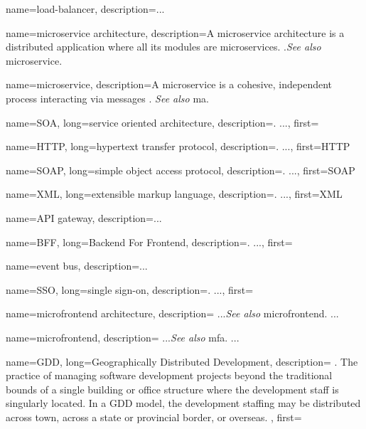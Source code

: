 {
    name=load-balancer,
    description={...} %
}

{
    name={microservice architecture},
    description={A microservice architecture is a distributed application where
    all its modules are microservices. \autocite{Dragoni_etal_2017}.\textit{See
    also} \gls{microservice}.} %
}

{
    name=microservice,
    description={A microservice is a cohesive, independent process interacting
    via messages \autocite{Dragoni_etal_2017}. \textit{See also} \gls{ma}.} %
}

{
    name=SOA,
    long={service oriented architecture},
    description={. ...},%
    first=
}

{
    name=HTTP,
    long={hypertext transfer protocol},
    description={. ...},%
    first=HTTP %
}

{
    name=SOAP,
    long={simple object access protocol},
    description={. ...},%
    first=SOAP
}

{
    name=XML,
    long={extensible markup language},
    description={. ...},%
    first=XML
}


{
    name=API gateway,
    description={...} %
}


{
    name=BFF,
    long={Backend For Frontend},
    description={. ...},%
    first=
}

{
    name={event bus},
    description={...} %
}

{
    name=SSO,
    long={single sign-on},
    description={. ...},%
    first=
}

{
    name={microfrontend architecture}, 
    description={
        ...\textit{See also} \gls{microfrontend}. ...%
    }   
}

{
    name=microfrontend, 
    description={
        ...\textit{See also} \gls{mfa}. ...%
    }   
}

{
    name=GDD, 
    long={Geographically Distributed Development},
    description={
        . The practice of managing software development projects
        beyond the traditional bounds of a single building or office structure where
        the development staff is singularly located. In a GDD model, the development
        staffing may be distributed across town, across a state or provincial
        border, or overseas. \autocite{Yuhong_2008}
    }, 
    first=
}

